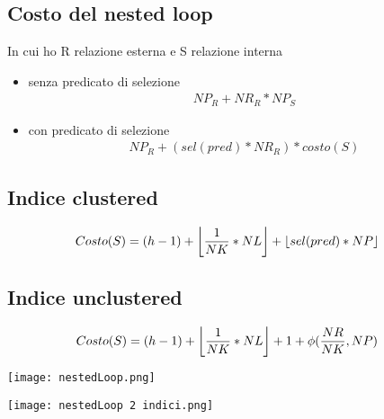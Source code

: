 \subsection{Costo del nested loop}
In cui ho R relazione esterna e S relazione interna
\begin{itemize}
    \item senza predicato di selezione 
    \begin{equation*}
        \begin{aligned}
        NP_R + NR_R * NP_S
        \end{aligned}
        \end{equation*}
    \item con predicato di selezione 
    \begin{equation*}
        \begin{aligned}
            NP_R + (sel(pred) * NR_R) * costo(S)
        \end{aligned}
        \end{equation*}
\end{itemize}
\subsection{Indice clustered}
    \begin{equation*}
        \begin{aligned}
            Costo(S)&= (h -1) + \floor*{\frac{1}{NK} * NL} +  \floor*{sel(pred) * NP}
        \end{aligned}
        \end{equation*}
\subsection{Indice unclustered}
    \begin{equation*}
        \begin{aligned}
            Costo(S)&= (h -1) + \floor*{\frac{1}{NK} * NL} + 1 + \phi(\frac{NR}{NK}, NP)
        \end{aligned}
        \end{equation*}

\begin{center}
    \texttt{[image: nestedLoop.png]}
\end{center}


\begin{center}
    \texttt{[image: nestedLoop 2 indici.png]}
\end{center}